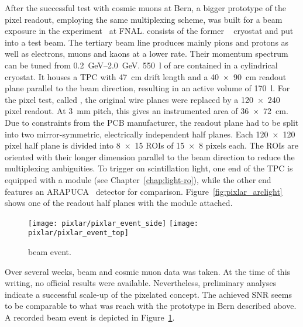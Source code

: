 After the successful test with cosmic muons at Bern, a bigger prototype of the pixel readout, employing the same multiplexing scheme, was built for a beam exposure in the \lariat{} experiment~\cite{lariat} at FNAL.
\lariat{} consists of the former \argoneut{}~\cite{argoneut} cryostat and \lartpc{} put into a test beam.
The tertiary beam line produces mainly pions and protons as well as electrons, muons and kaons at a lower rate.
Their momentum spectrum can be tuned from \SIrange{0.2}{2.0}{\giga\electronvolt}.
\SI{550}{\litre} of \lar{} are contained in a cylindrical cryostat.
It houses a TPC with \SI{47}{\centi\metre} drift length and a \SI{40 x 90}{\centi\metre} readout plane parallel to the beam direction, resulting in an active volume of \SI{170}{\litre}.
For the pixel test, called \pixlar{}, the original wire planes were replaced by a \num{120 x 240} pixel readout.
At \SI{3}{\milli\metre} pitch, this gives an instrumented area of \SI{36 x 72}{\centi\metre}.
Due to constraints from the PCB manufacturer, the readout plane had to be split into two mirror-symmetric, electrically independent half planes.
Each \num{120 x 120} pixel half plane is divided into \num{8 x 15} ROIs of \num{15 x 8} pixels each.
The ROIs are oriented with their longer dimension parallel to the beam direction to reduce the multiplexing ambiguities.
To trigger on scintillation light, one end of the TPC is equipped with a \AL{} module (see Chapter~\ref{chap:light-ro}), while the other end features an ARAPUCA~\cite{arapuca} detector for comparison.
Figure~\ref{fig:pixlar_arclight} shows one of the readout half planes with the \AL{} module attached.

\begin{figure}[htb]
	\centering
	\texttt{[image: pixlar/pixlar\_event\_side]}
	\texttt{[image: pixlar/pixlar\_event\_top]}
	\caption{\pixlar{} beam event.}
	\label{fig:pixlar_event}
\end{figure}

Over several weeks, beam and cosmic muon data was taken.
At the time of this writing, no official results were available.
Nevertheless, preliminary analyses indicate a successful scale-up of the pixelated \lartpc{} concept.
The achieved SNR seems to be comparable to what was reach with the prototype in Bern described above.
A recorded beam event is depicted in Figure~\ref{fig:pixlar_event}.
